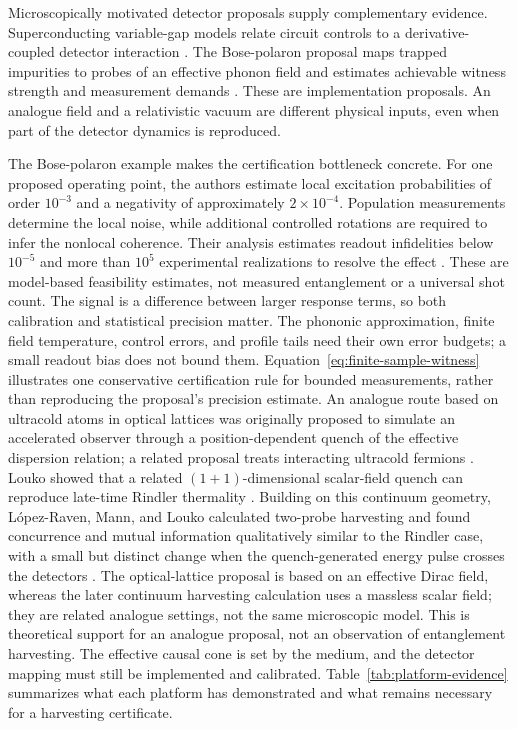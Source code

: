 \documentclass[pdflatex,sn-mathphys-num]{sn-jnl}
\begin{document}
Microscopically motivated detector proposals supply complementary evidence. Superconducting variable-gap models relate circuit controls to a derivative-coupled detector interaction \cite{TeixidoBonfill2026}. The Bose-polaron proposal maps trapped impurities to probes of an effective phonon field and estimates achievable witness strength and measurement demands \cite{PercheGozzini2026}. These are implementation proposals. An analogue field and a relativistic vacuum are different physical inputs, even when part of the detector dynamics is reproduced.

The Bose-polaron example makes the certification bottleneck concrete. For one proposed operating point, the authors estimate local excitation probabilities of order $10^{-3}$ and a negativity of approximately $2\times10^{-4}$. Population measurements determine the local noise, while additional controlled rotations are required to infer the nonlocal coherence. Their analysis estimates readout infidelities below $10^{-5}$ and more than $10^5$ experimental realizations to resolve the effect \cite{PercheGozzini2026}. These are model-based feasibility estimates, not measured entanglement or a universal shot count. The signal is a difference between larger response terms, so both calibration and statistical precision matter. The phononic approximation, finite field temperature, control errors, and profile tails need their own error budgets; a small readout bias does not bound them. Equation~\eqref{eq:finite-sample-witness} illustrates one conservative certification rule for bounded measurements, rather than reproducing the proposal's precision estimate. An analogue route based on ultracold atoms in optical lattices was originally proposed to simulate an accelerated observer through a position-dependent quench of the effective dispersion relation; a related proposal treats interacting ultracold fermions \cite{RodriguezLaguna2017,KosiorLewensteinCeli2018}. Louko showed that a related $(1+1)$-dimensional scalar-field quench can reproduce late-time Rindler thermality \cite{Louko2018RindlerQuench}. Building on this continuum geometry, López-Raven, Mann, and Louko calculated two-probe harvesting and found concurrence and mutual information qualitatively similar to the Rindler case, with a small but distinct change when the quench-generated energy pulse crosses the detectors \cite{LopezRavenMannLouko2025}. The optical-lattice proposal is based on an effective Dirac field, whereas the later continuum harvesting calculation uses a massless scalar field; they are related analogue settings, not the same microscopic model. This is theoretical support for an analogue proposal, not an observation of entanglement harvesting. The effective causal cone is set by the medium, and the detector mapping must still be implemented and calibrated. Table~\ref{tab:platform-evidence} summarizes what each platform has demonstrated and what remains necessary for a harvesting certificate.
\end{document}
